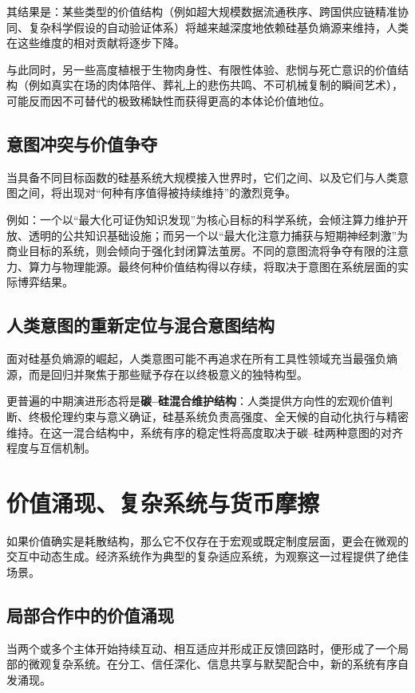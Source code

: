 \documentclass[11pt,a4paper]{ctexart}
\begin{document}
其结果是：某些类型的价值结构（例如超大规模数据流通秩序、跨国供应链精准协同、复杂科学假设的自动验证体系）将越来越深度地依赖硅基负熵源来维持，人类在这些维度的相对贡献将逐步下降。

与此同时，另一些高度植根于生物肉身性、有限性体验、悲悯与死亡意识的价值结构（例如真实在场的肉体陪伴、葬礼上的悲伤共鸣、不可机械复制的瞬间艺术），可能反而因不可替代的极致稀缺性而获得更高的本体论价值地位。

\subsection{意图冲突与价值争夺}
当具备不同目标函数的硅基系统大规模接入世界时，它们之间、以及它们与人类意图之间，将出现对“何种有序值得被持续维持”的激烈竞争。

例如：一个以“最大化可证伪知识发现”为核心目标的科学系统，会倾注算力维护开放、透明的公共知识基础设施；而另一个以“最大化注意力捕获与短期神经刺激”为商业目标的系统，则会倾向于强化封闭算法茧房。不同的意图流将争夺有限的注意力、算力与物理能源。最终何种价值结构得以存续，将取决于意图在系统层面的实际博弈结果。

\subsection{人类意图的重新定位与混合意图结构}
面对硅基负熵源的崛起，人类意图可能不再追求在所有工具性领域充当最强负熵源，而是回归并聚焦于那些赋予存在以终极意义的独特构型。

更普遍的中期演进形态将是\textbf{碳--硅混合维护结构}：人类提供方向性的宏观价值判断、终极伦理约束与意义确证，硅基系统负责高强度、全天候的自动化执行与精密维持。在这一混合结构中，系统有序的稳定性将高度取决于碳--硅两种意图的对齐程度与互信机制。

\section{价值涌现、复杂系统与货币摩擦}

如果价值确实是耗散结构，那么它不仅存在于宏观或既定制度层面，更会在微观的交互中动态生成。经济系统作为典型的复杂适应系统，为观察这一过程提供了绝佳场景。

\subsection{局部合作中的价值涌现}
当两个或多个主体开始持续互动、相互适应并形成正反馈回路时，便形成了一个局部的微观复杂系统。在分工、信任深化、信息共享与默契配合中，新的系统有序自发涌现。
\end{document}
